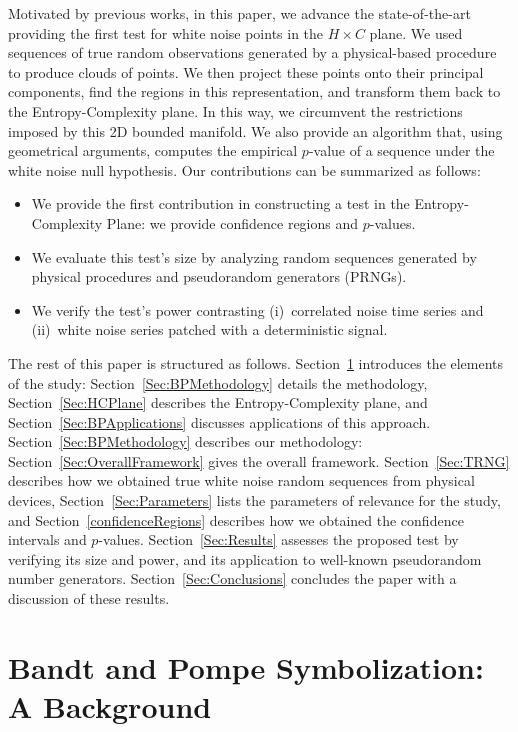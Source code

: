 \documentclass[alpha-refs]{wiley-article}
\begin{document}
Motivated by previous works, in this paper, we advance the state-of-the-art providing the first test for white noise points in the $H\times C$ plane.
We used sequences of true random observations generated by a physical-based procedure to produce clouds of points. 
We then project these points onto their principal components, find the regions in this representation, and transform them back to the Entropy-Complexity plane.
In this way, we circumvent the restrictions imposed by this 2D bounded manifold.
We also provide an algorithm that, using geometrical arguments, computes the empirical $p$-value of a sequence under the white noise null hypothesis.
Our contributions can be summarized as follows:
\begin{itemize}
	\item We provide the first contribution in constructing a test in the Entropy-Complexity Plane: we provide confidence regions and $p$-values.
	\item We evaluate this test's size by analyzing random sequences generated by physical procedures and pseudorandom generators (PRNGs).
	\item We verify the test's power contrasting (i)~correlated noise time series and (ii)~white noise series patched with a deterministic signal.
\end{itemize}

The rest of this paper is structured as follows. 
Section~\ref{Sec:BP} introduces the elements of the study:
Section~\ref{Sec:BPMethodology} details the methodology,
Section~\ref{Sec:HCPlane} describes the Entropy-Complexity plane,
and Section~\ref{Sec:BPApplications} discusses applications of this approach.
%
Section~\ref{Sec:BPMethodology} describes our methodology:
Section~\ref{Sec:OverallFramework} gives the overall framework.
Section~\ref{Sec:TRNG} describes how we obtained true white noise random sequences from physical devices,
Section~\ref{Sec:Parameters} lists the parameters of relevance for the study, and
Section~\ref{confidenceRegions} describes how we obtained the confidence intervals and $p$-values.
%
Section~\ref{Sec:Results} assesses the proposed test by verifying its size and power, and its application to well-known pseudorandom number generators.
Section~\ref{Sec:Conclusions} concludes the paper with a discussion of these results.

\section{Bandt and Pompe Symbolization: A Background}\label{Sec:BP}
\end{document}
